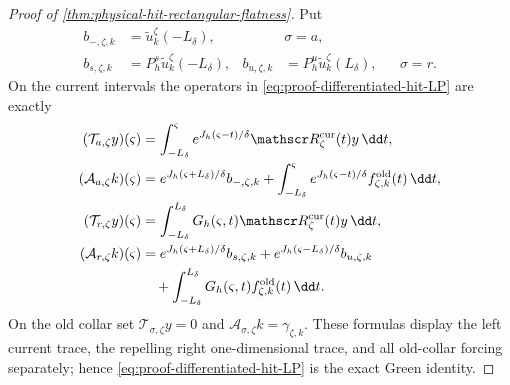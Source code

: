 \begin{proof}[Proof of
\cref{thm:physical-hit-rectangular-flatness}]
Put
\begin{align*}
 b_{-,\zeta,k}&=\widetilde u_k^\zeta(-L_\delta),
 &&\sigma=a,\\
 b_{s,\zeta,k}&=P_h^s\widetilde u_k^\zeta(-L_\delta),
 &b_{u,\zeta,k}&=P_h^u\widetilde u_k^\zeta(L_\delta),
 &&\sigma=r.
\end{align*}
On the current intervals the operators in
\cref{eq:proof-differentiated-hit-LP} are exactly
\begin{align}
 (\mathcal T_{a,\zeta}y)(\varsigma)
 &=\int_{-L_\delta}^{\varsigma}
   e^{J_h(\varsigma-t)/\delta}
   \mathscr R_\zeta^{\rm cur}(t)y\,\dd t,\notag\\
 (\mathcal A_{a,\zeta}k)(\varsigma)
 &=e^{J_h(\varsigma+L_\delta)/\delta}b_{-,\zeta,k}
   +\int_{-L_\delta}^{\varsigma}
      e^{J_h(\varsigma-t)/\delta}
          f_{\zeta,k}^{\rm old}(t)\,\dd t,       \label{eq:proof-centered-attracting-operators}\\
 (\mathcal T_{r,\zeta}y)(\varsigma)
 &=\int_{-L_\delta}^{L_\delta}
      G_h(\varsigma,t)
      \mathscr R_\zeta^{\rm cur}(t)y\,\dd t,\notag\\
 (\mathcal A_{r,\zeta}k)(\varsigma)
 &=e^{J_h(\varsigma+L_\delta)/\delta}b_{s,\zeta,k}
   +e^{J_h(\varsigma-L_\delta)/\delta}b_{u,\zeta,k}\notag\\
 &\quad+\int_{-L_\delta}^{L_\delta}
      G_h(\varsigma,t)f_{\zeta,k}^{\rm old}(t)\,\dd t.
                                                               \label{eq:proof-centered-repelling-operators}
\end{align}
On the old collar set $\mathcal T_{\sigma,\zeta}y=0$ and
$\mathcal A_{\sigma,\zeta}k=\gamma_{\zeta,k}$.  These formulas display
the left current trace, the repelling right one-dimensional trace, and all
old-collar forcing separately; hence
\cref{eq:proof-differentiated-hit-LP} is the exact Green identity.


\end{proof}
